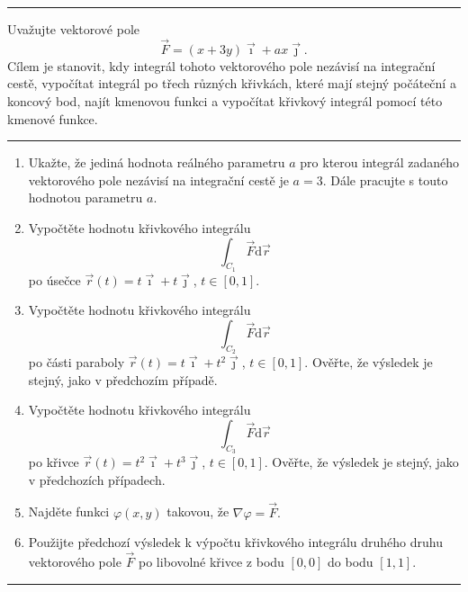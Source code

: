 \documentclass{article}
\begin{document}
{

  }


  
  \bigskip
  \hrule
  
  \bigskip Uvažujte vektorové pole
  $$\vec F=(x+3y)\vec \imath + ax\vec\jmath.$$ Cílem je stanovit, kdy
  integrál tohoto vektorového pole nezávisí na integrační cestě,
  vypočítat integrál po třech různých křivkách, které mají stejný
  počáteční a koncový bod, najít kmenovou funkci a vypočítat křivkový
  integrál pomocí této kmenové funkce.  \bigskip \hrule
  
\begin{enumerate}[1)]
\item Ukažte, že jediná hodnota reálného parametru $a$ pro kterou integrál zadaného vektorového pole nezávisí na integrační cestě je $a=3$. Dále pracujte s touto hodnotou parametru $a$.
\item Vypočtěte hodnotu křivkového integrálu $$\int_{C_1} \vec F\mathrm d\vec r$$ po úsečce $\vec r(t)=t\vec \imath+t\vec \jmath$, $t\in[0,1]$.
\item Vypočtěte hodnotu křivkového integrálu $$\int_{C_2} \vec F\mathrm d\vec r$$ po části paraboly $\vec r(t)=t\vec \imath+t^2\vec \jmath$, $t\in[0,1]$. Ověřte, že výsledek je stejný, jako v předchozím případě.
\item Vypočtěte hodnotu křivkového integrálu $$\int_{C_3} \vec F\mathrm d\vec r$$ po křivce $\vec r(t)=t^2\vec \imath+t^3\vec \jmath$, $t\in[0,1]$. Ověřte, že výsledek je stejný, jako v předchozích případech.
\item Najděte funkci $\varphi(x,y)$ takovou, že $\nabla \varphi=\vec F.$
\item Použijte předchozí výsledek k výpočtu křivkového integrálu druhého druhu vektorového pole $\vec F$ po libovolné křivce z bodu $[0,0]$ do bodu $[1,1]$.
\end{enumerate}

\hrule
\bigskip
\end{document}

